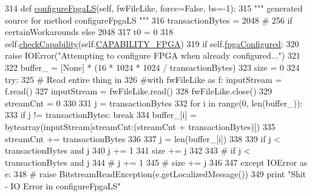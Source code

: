 \begin{DoxyCode}
314     \textcolor{keyword}{def }\hyperlink{classsoftware_1_1chipwhisperer_1_1capture_1_1scopes_1_1cwhardware_1_1ztex__fwloader_1_1Ztex1v1_a42ad08d0e44c5ca2fb431d43c345f26a}{configureFpgaLS}(self, fwFileLike, force=False, bs=-1):
315         \textcolor{stringliteral}{""" generated source for method configureFpgaLS """}
316         transactionBytes = 2048  \textcolor{comment}{# 256 if certainWorkarounds else 2048}
317         t0 = 0
318         self.\hyperlink{classsoftware_1_1chipwhisperer_1_1capture_1_1scopes_1_1cwhardware_1_1ztex__fwloader_1_1Ztex1v1_aeab1075e0ac4bea8aa37fd29804410f0}{checkCapability}(self.\hyperlink{classsoftware_1_1chipwhisperer_1_1capture_1_1scopes_1_1cwhardware_1_1ztex__fwloader_1_1Ztex1v1_a6052fb96d805e899a0c386e491ddbf2c}{CAPABILITY\_FPGA})
319         \textcolor{keywordflow}{if} self.\hyperlink{classsoftware_1_1chipwhisperer_1_1capture_1_1scopes_1_1cwhardware_1_1ztex__fwloader_1_1Ztex1v1_ac022e486e3e33ada7251dce0e648a78d}{fpgaConfigured}:
320             \textcolor{keywordflow}{raise} IOError(\textcolor{stringliteral}{"Attempting to configure FPGA when already configured..."})
321 
322         buffer\_ = [\textcolor{keywordtype}{None}] * (16 * 1024 * 1024 / transactionBytes)
323         size = 0
324         \textcolor{keywordflow}{try}:
325             \textcolor{comment}{# Read entire thing in}
326             \textcolor{comment}{#with fwFileLike as f: inputStream = f.read()}
327             inputStream = fwFileLike.read()
328             fwFileLike.close()
329             streamCnt = 0
330 
331             j = transactionBytes
332             \textcolor{keywordflow}{for} i \textcolor{keywordflow}{in} range(0, len(buffer\_)):
333                 \textcolor{keywordflow}{if} j != transactionBytes: \textcolor{keywordflow}{break}
334                 buffer\_[i] = bytearray(inputStream[streamCnt:(streamCnt + transactionBytes)])
335                 streamCnt += transactionBytes
336 
337                 j = len(buffer\_[i])
338 
339                 \textcolor{keywordflow}{if} j < transactionBytes \textcolor{keywordflow}{and} j %
340                     j += 1
341                 size += j
342 
343                 \textcolor{comment}{# if j < transactionBytes and j %
344                 \textcolor{comment}{#    j += 1}
345                 \textcolor{comment}{# size += j}
346 
347         \textcolor{keywordflow}{except} IOError \textcolor{keyword}{as} e:
348             \textcolor{comment}{# raise BitstreamReadException(e.getLocalizedMessage())}
349             \textcolor{keywordflow}{print} \textcolor{stringliteral}{"Shit - IO Error in configureFpgaLS"}
}
\end{DoxyCode}
